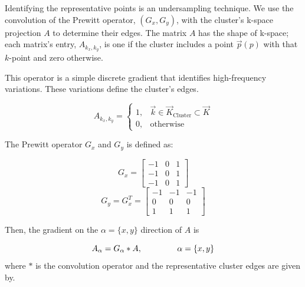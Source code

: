 \documentclass[a4paper,12pt]{report}
\begin{document}
\begin{appendices}
Identifying the representative points is an undersampling technique.
We use the convolution of the Prewitt operator, $(G_x, G_y)$, with the cluster's k-space projection $A$ to determine their edges.
The matrix $A$ has the shape of k-space; each matrix's entry, $A_{k_x,k_y}$, is one if the cluster includes a point $\vec{p}(p)$ with that $k$-point and zero otherwise.

 This operator is a simple discrete gradient that identifies high-frequency variations. These variations define the cluster's edges.


\begin{equation}
    A_{k_x,k_y} = \left\{
    \begin{array}{cc}
        1, & \vec{k} \in \vec{K}_\text{Cluster}\subset \vec{K} \\
        0, & \text{otherwise}
    \end{array}
    \right.
\end{equation}

The Prewitt operator $G_x$ and $G_y$ is defined as:

\begin{multicols}{2}
    \begin{equation}
        G_x = \left[
            \begin{array}{ccc}
                -1 & 0 & 1 \\
                -1 & 0 & 1 \\
                -1 & 0 & 1
            \end{array}
            \right]
    \end{equation}
    \begin{equation}
        G_y = G_x^T=\left[
            \begin{array}{ccc}
                -1 & -1 & -1 \\
                0  & 0  & 0  \\
                1  & 1  & 1
            \end{array}
            \right]
    \end{equation}
\end{multicols}

Then, the gradient on the $\alpha=\{x,y\}$ direction of $A$ is

\begin{equation}
    A_\alpha = G_\alpha \ast A,\hspace{1.5cm}\alpha=\{x,y\}
\end{equation}
where $\ast$ is the convolution operator and the representative cluster edges are given by.


\end{appendices}
\end{document}
